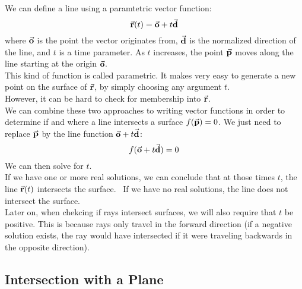 \documentclass[12pt]{article}
\begin{document}
    We can define a line using a paramtetric
    vector function:
    \[ \vec{\mathbf{r}}(t) = \vec{\mathbf{o}} + t\vec{\mathbf{d}} \]
    where $\vec{\mathbf{o}}$ is the point the vector originates from,
    $\vec{\mathbf{d}}$ is the normalized direction of the line,
    and $t$ is a time parameter.
    As $t$ increases, the point $\vec{\mathbf{p}}$ moves along the
    line starting at the origin $\vec{\mathbf{o}}$. \\

    This kind of function is called parametric.
    It makes very easy to generate a new point
    on the surface of $\vec{\mathbf{r}}$,
    by simply choosing any argument $t$. \\
    However, it can be hard to check for membership
    into $\vec{\mathbf{r}}$. \\

    We can combine these two approaches to writing
    vector functions in order to 
    determine if and where a line intersects
    a surface $f(\vec{\mathbf{p}}) = 0$.
    We just need to replace
    $\vec{\mathbf{p}}$ by the line function $\vec{\mathbf{o}} + t\vec{\mathbf{d}}$:
    \[ f(\vec{\mathbf{o}} + t\vec{\mathbf{d}}) = 0 \]
    We can then solve for $t$. \\

    If we have one or more real solutions,
    we can conclude that at those times $t$,
    the line $\vec{\mathbf{r}}(t)$ intersects the surface. \
    If we have no real solutions,
    the line does not intersect the surface. \\
    
    Later on, when chekcing if rays intersect surfaces,
    we will also require that $t$ be positive.
    This is because rays only travel in the forward
    direction
    (if a negative solution exists,
    the ray would have intersected if it were traveling
    backwards in the opposite direction).

    \newpage

    \subsection*{Intersection with a Plane}
\end{document}
